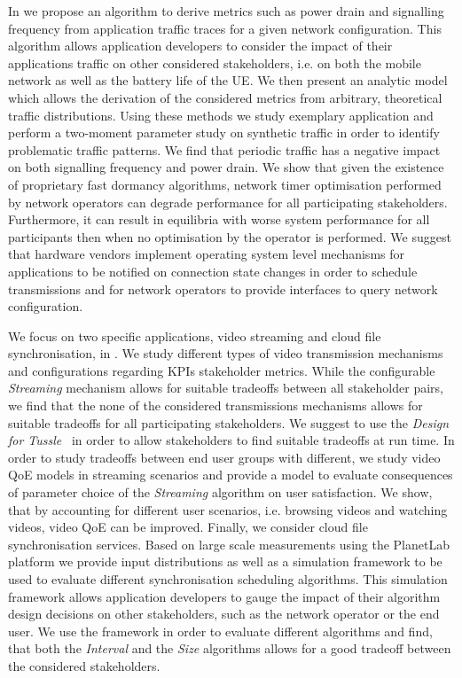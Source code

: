 In  we propose an algorithm to derive metrics such as power drain and signalling frequency from application traffic traces for a given network configuration.
This algorithm allows application developers to consider the impact of their applications  traffic on other considered stakeholders, i.e. on both the mobile network as well as the battery life of the \gls{UE}.
We then present an analytic model which allows the derivation of the considered metrics from arbitrary, theoretical traffic distributions.
Using these methods we study exemplary application and perform a two-moment parameter study on synthetic traffic in order to identify problematic traffic patterns.
We find that periodic traffic has a negative impact on both signalling frequency and power drain.
We show that given the existence of proprietary fast dormancy algorithms, network timer optimisation performed by network operators can degrade performance for all participating stakeholders. 
Furthermore, it can result in equilibria with worse system performance for all participants then when no optimisation by the operator is performed.  
We suggest that hardware vendors implement operating system level mechanisms for applications to be notified on connection state changes in order to schedule transmissions and for network operators to provide interfaces to query network configuration.

We focus on two specific applications, video streaming and cloud file synchronisation, in .
We study different types of video transmission mechanisms and configurations regarding \glspl{KPI} stakeholder metrics.
While the configurable \emph{Streaming} mechanism allows for suitable tradeoffs between all stakeholder pairs, we find that the none of the considered transmissions mechanisms allows for suitable tradeoffs for all participating stakeholders.
We suggest to use the \emph{Design for Tussle}~\cite{Clark2005} in order to allow stakeholders to find suitable tradeoffs at run time.
In order to study tradeoffs between end user groups with different, we study video \gls{QoE} models in streaming scenarios and provide a model to evaluate consequences of parameter choice of the \emph{Streaming} algorithm on user satisfaction.
We show, that by accounting for different user scenarios, i.e. browsing videos and watching videos, video \gls{QoE} can be improved.
Finally, we consider cloud file synchronisation services.
Based on large scale measurements using the PlanetLab platform we provide input distributions as well as a simulation framework to be used to evaluate different synchronisation scheduling algorithms.
This simulation framework allows application developers to gauge the impact of their algorithm design decisions on other stakeholders, such as the network operator or the end user.
We use the framework in order to evaluate different algorithms and find, that both the \emph{Interval} and the \emph{Size} algorithms allows for a good tradeoff between the considered stakeholders.

